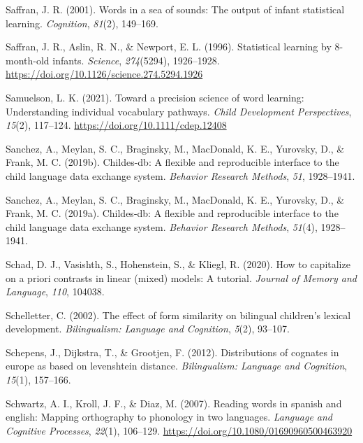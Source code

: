 \documentclass[
  12pt,
  b5paperpaper,
  twoside]{scrreprt}
\newlength{\cslhangindent}
\newlength{\cslentryspacingunit} %
\newenvironment{CSLReferences}[2] %
 {%
  \setlength{\parindent}{0pt}
  \ifodd #1
  \let\oldpar\par
  \def\par{\hangindent=\cslhangindent\oldpar}
  \fi
  \setlength{\parskip}{#2\cslentryspacingunit}
 }%
 {}
\begin{document}
\begin{CSLReferences}{1}{0}
\leavevmode{}%
Saffran, J. R. (2001). Words in a sea of sounds: The output of infant
statistical learning. \emph{Cognition}, \emph{81}(2), 149--169.

\leavevmode{}%
Saffran, J. R., Aslin, R. N., \& Newport, E. L. (1996). Statistical
learning by 8-month-old infants. \emph{Science}, \emph{274}(5294),
1926--1928. \url{https://doi.org/10.1126/science.274.5294.1926}

\leavevmode{}%
Samuelson, L. K. (2021). Toward a precision science of word learning:
Understanding individual vocabulary pathways. \emph{Child Development
Perspectives}, \emph{15}(2), 117--124.
\url{https://doi.org/10.1111/cdep.12408}

\leavevmode{}%
Sanchez, A., Meylan, S. C., Braginsky, M., MacDonald, K. E., Yurovsky,
D., \& Frank, M. C. (2019b). Childes-db: A flexible and reproducible
interface to the child language data exchange system. \emph{Behavior
Research Methods}, \emph{51}, 1928--1941.

\leavevmode{}%
Sanchez, A., Meylan, S. C., Braginsky, M., MacDonald, K. E., Yurovsky,
D., \& Frank, M. C. (2019a). Childes-db: A flexible and reproducible
interface to the child language data exchange system. \emph{Behavior
Research Methods}, \emph{51}(4), 1928--1941.

\leavevmode{}%
Schad, D. J., Vasishth, S., Hohenstein, S., \& Kliegl, R. (2020). How to
capitalize on a priori contrasts in linear (mixed) models: A tutorial.
\emph{Journal of Memory and Language}, \emph{110}, 104038.

\leavevmode{}%
Schelletter, C. (2002). The effect of form similarity on bilingual
children's lexical development. \emph{Bilingualism: Language and
Cognition}, \emph{5}(2), 93--107.

\leavevmode{}%
Schepens, J., Dijkstra, T., \& Grootjen, F. (2012). Distributions of
cognates in europe as based on levenshtein distance. \emph{Bilingualism:
Language and Cognition}, \emph{15}(1), 157--166.

\leavevmode{}%
Schwartz, A. I., Kroll, J. F., \& Diaz, M. (2007). Reading words in
spanish and english: Mapping orthography to phonology in two languages.
\emph{Language and Cognitive Processes}, \emph{22}(1), 106--129.
\url{https://doi.org/10.1080/01690960500463920}


\end{CSLReferences}
\end{document}
